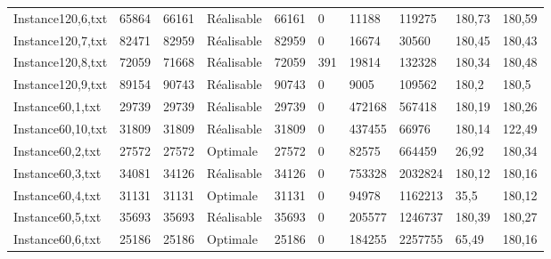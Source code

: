 \documentclass[a4paper,12pt]{article}
\theoremstyle{blueDefinition}
\theoremstyle{redProperty}
\begin{document}
\begin{table}[htbp]
\begin{tabular}{|l|p{40pt}|p{40pt}|p{55pt}|p{45pt}|p{35pt}|p{35pt}|p{35pt}|p{35pt}|p{35pt}|}
Instance120,6,txt  & 65864            & 66161               & Réalisable                & 66161              & 0          & 11188            & 119275               & 180,73           & 180,59               \\
Instance120,7,txt  & 82471            & 82959               & Réalisable                & 82959              & 0          & 16674            & 30560                & 180,45           & 180,43               \\
Instance120,8,txt  & 72059            & 71668               & Réalisable                & 72059              & 391        & 19814            & 132328               & 180,34           & 180,48               \\
Instance120,9,txt  & 89154            & 90743               & Réalisable                & 90743              & 0          & 9005             & 109562               & 180,2            & 180,5                \\
Instance60,1,txt   & 29739            & 29739               & Réalisable                & 29739              & 0          & 472168           & 567418               & 180,19           & 180,26               \\
Instance60,10,txt  & 31809            & 31809               & Réalisable                & 31809              & 0          & 437455           & 66976                & 180,14           & 122,49               \\
Instance60,2,txt   & 27572            & 27572               & Optimale                  & 27572              & 0          & 82575            & 664459               & 26,92            & 180,34               \\
Instance60,3,txt   & 34081            & 34126               & Réalisable                & 34126              & 0          & 753328           & 2032824              & 180,12           & 180,16               \\
Instance60,4,txt   & 31131            & 31131               & Optimale                  & 31131              & 0          & 94978            & 1162213              & 35,5             & 180,12               \\
Instance60,5,txt   & 35693            & 35693               & Réalisable                & 35693              & 0          & 205577           & 1246737              & 180,39           & 180,27               \\
Instance60,6,txt   & 25186            & 25186               & Optimale                  & 25186              & 0          & 184255           & 2257755              & 65,49            & 180,16               \\

\end{tabular}
\end{table}
\end{document}
